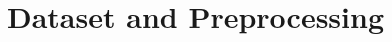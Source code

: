 \documentclass[conference]{IEEEtran}
\begin{document}
\section{Dataset and Preprocessing}

 

\end{document}
